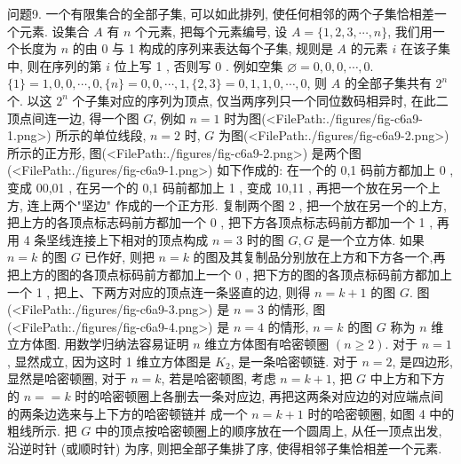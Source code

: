 问题9. 一个有限集合的全部子集, 可以如此排列, 使任何相邻的两个子集恰相差一个元素.
设集合 $A$ 有 $n$ 个元素, 把每个元素编号, 设 $A=\{1,2,3, \cdots, n\}$, 我们用一个长度为 $n$ 的由 0 与 1 构成的序列来表达每个子集, 规则是 $A$ 的元素 $i$ 在该子集中, 则在序列的第 $i$ 位上写 1 , 否则写 0 . 例如空集 $\varnothing=0,0,0, \cdots, 0$. $\{1\}=1,0,0, \cdots, 0,\{n\}=0,0, \cdots, 1,\{2,3\}=0,1,1,0, \cdots, 0$, 则 $A$ 的全部子集共有 $2^n$ 个.
以这 $2^n$ 个子集对应的序列为顶点, 仅当两序列只一个同位数码相异时, 在此二顶点间连一边, 得一个图 $G$, 例如 $n=1$ 时为图(<FilePath:./figures/fig-c6a9-1.png>) 所示的单位线段, $n=2$ 时, $G$ 为图(<FilePath:./figures/fig-c6a9-2.png>) 所示的正方形, 图(<FilePath:./figures/fig-c6a9-2.png>) 是两个图(<FilePath:./figures/fig-c6a9-1.png>) 如下作成的: 在一个的 0,1 码前方都加上 0 , 变成 00,01 , 在另一个的 0,1 码前都加上 1 , 变成 10,11 , 再把一个放在另一个上方, 连上两个"坚边" 作成的一个正方形.
复制两个图 2 , 把一个放在另一个的上方, 把上方的各顶点标志码前方都加一个 0 , 把下方各顶点标志码前方都加一个 1 , 再用 4 条坚线连接上下相对的顶点构成 $n=3$ 时的图 $G, G$ 是一个立方体.
如果 $n=k$ 的图 $G$ 已作好, 则把 $n=k$ 的图及其复制品分别放在上方和下方各一个,再把上方的图的各顶点标码前方都加上一个 0 , 把下方的图的各顶点标码前方都加上一个 1 , 把上、下两方对应的顶点连一条竖直的边, 则得 $n=k+1$ 的图 $G$. 图(<FilePath:./figures/fig-c6a9-3.png>) 是 $n=3$ 的情形, 图(<FilePath:./figures/fig-c6a9-4.png>) 是 $n=4$ 的情形, $n= k$ 的图 $G$ 称为 $n$ 维立方体图.
用数学归纳法容易证明 $n$ 维立方体图有哈密顿圈 $(n \geqslant 2)$. 对于 $n=1$, 显然成立, 因为这时 1 维立方体图是 $K_2$, 是一条哈密顿链.
对于 $n=2$, 是四边形, 显然是哈密顿圈, 对于 $n=k$, 若是哈密顿图, 考虑 $n=k+1$, 把 $G$ 中上方和下方的 $n==k$ 时的哈密顿圈上各删去一条对应边, 再把这两条对应边的对应端点间的两条边选来与上下方的哈密顿链并
成一个 $n=k+1$ 时的哈密顿圈, 如图 4 中的粗线所示.
把 $G$ 中的顶点按哈密顿圈上的顺序放在一个圆周上, 从任一顶点出发, 沿逆时针 (或顺时针) 为序, 则把全部子集排了序, 使得相邻子集恰相差一个元素.



